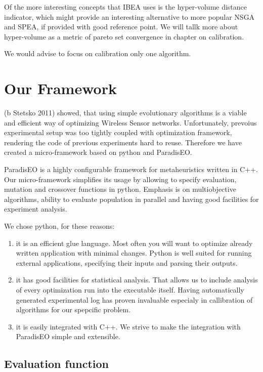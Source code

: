 \documentclass[12pt,oneside,draft]{fithesis2}
\begin{document}
Of the more interesting concepts that IBEA uses is the hyper-volume distance indicator, which might provide an interesting alternative to more popular NSGA and SPEA, if provided with good reference point. We will tallk more about hyper-volume as a metric of pareto set convergence in chapter on calibration.

We would advise to focus on calibration only one algorithm.

\chapter{Our Framework}

(b Stetsko 2011) showed, that using simple evolutionary algorithms is a viable and efficient way of optimizing Wireless Sensor networks. Unfortunately, prevoius experimental setup was too tightly coupled with optimization framework, rendering the code of previous experiments hard to reuse. Therefore we have created a micro-framework based on python and ParadisEO. 

ParadisEO is a highly configurable framework for metaheuristics written in C++. Our micro-framework simplifies its usage by allowing to specify evaluation, mutation and crossover functions in python. Emphasis is on multiobjective algorithms, ability to evaluate population in parallel and having good facilities for experiment analysis.

We chose python, for these reasons:
\begin{enumerate}
\item it is an efficient glue language. 
Most often you will want to optimize already written application with minimal changes. Python is well suited for running external applications, specifying their inputs and parsing their outputs.
 
\item it has good facilities for statistical analysis.
That allows us to include analysis of every optimization run into the executable itself. Having automatically generated experimental log has proven invaluable especialy in callibration of algorithms for our spepcific problem.

\item it is easily integrated with C++.
We strive to make the integration with ParadisEO simple and extensible. 
\end{enumerate}
\section{Evaluation function}
\end{document}
